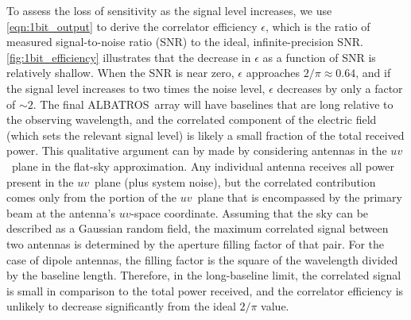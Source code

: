 \documentclass{ws-jai}
\def\albatros{ALBATROS}
\begin{document}

To assess the loss of sensitivity as the signal level increases, we
use \autoref{eqn:1bit_output} to derive the correlator efficiency
$\epsilon$, which is the ratio of measured signal-to-noise ratio (SNR)
to the ideal, infinite-precision SNR.  \autoref{fig:1bit_efficiency}
illustrates that the decrease in $\epsilon$ as a function of SNR is
relatively shallow.  When the SNR is near zero, $\epsilon$ approaches
$2/\pi \approx 0.64$, and if the signal level increases to two times
the  
noise level, $\epsilon$ decreases by only a factor of $\sim2$.  The
final \albatros\ array will have baselines that are long relative to
the observing wavelength, and the correlated component of the electric
field (which sets the relevant signal level) is likely a small
fraction of the total received power.  This qualitative argument can
by made by considering antennas in the $uv$~plane in the flat-sky
approximation.  Any individual antenna receives all power present in
the $uv$~plane (plus system noise), but the correlated contribution
comes only from the portion of the $uv$~plane that is encompassed by
the primary beam at the antenna's $uv$-space coordinate.  Assuming
that the sky can be described as a Gaussian random field, the maximum
correlated signal between two antennas is determined by the aperture
filling factor of that pair.  For the case of dipole antennas, the
filling factor is the square of the wavelength divided by the baseline
length.  Therefore, in the long-baseline limit, the correlated signal
is small in comparison to the total power received, and the correlator
efficiency is unlikely to decrease significantly from the ideal
$2/\pi$ value.
\end{document}
